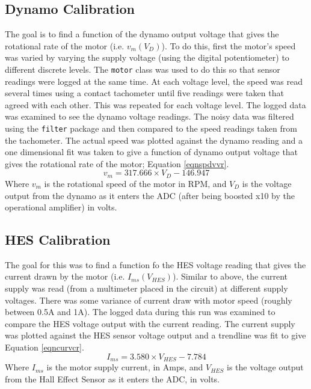 \documentclass[twoside,a4]{report}
\begin{document}
	\subsection*{Dynamo Calibration}
	The goal is to find a function of the dynamo output voltage that gives the rotational rate of the motor (i.e. \(v_m ({V_D})\)). To do this, first the motor's speed was varied by varying the supply voltage (using the digital potentiometer) to different discrete levels. The \texttt{motor} class was used to do this so that sensor readings were logged at the same time. At each voltage level, the speed was read several times using a contact tachometer until five readings were taken that agreed with each other. This was repeated for each voltage level. The logged data was examined to see the dynamo voltage readings. The noisy data was filtered using the \texttt{filter} package and then compared to the speed readings taken from the tachometer. The actual speed was plotted against the dynamo reading and a one dimensional fit was taken to give a function of dynamo output voltage that gives the rotational rate of the motor; Equation \ref{eqnspdvvr}.
	\begin{equation}
	v_m = 317.666 \times {V_D} - 146.947
	\label{eqnspdvvr}
	\end{equation}
	Where \(v_m\) is the rotational speed of the motor in RPM, and \(V_D\) is the voltage output from the dynamo as it enters the ADC (after being boosted x10 by the operational amplifier) in volts.
	\subsection*{HES Calibration}
	The goal for this was to find a function fo the HES voltage reading that gives the current drawn by the motor (i.e. \(I_{ms} ({V_{HES}})\)). Similar to above, the current supply was read (from a multimeter placed in the circuit) at different supply voltages. There was some variance of current draw with motor speed (roughly between 0.5A and 1A). The logged data during this run was examined to compare the HES voltage output with the current reading. The current supply was plotted against the HES sensor voltage output and a trendline was fit to give Equation \ref{eqncurvcr}.
	\begin{equation}
	I_{ms} = 3.580 \times {V_{HES}} - 7.784
	\label{eqncurvcr}
	\end{equation}
	Where \(I_{ms}\) is the motor supply current, in Amps, and \(V_{HES}\) is the voltage output from the Hall Effect Sensor as it enters the ADC, in volts.
\end{document}
